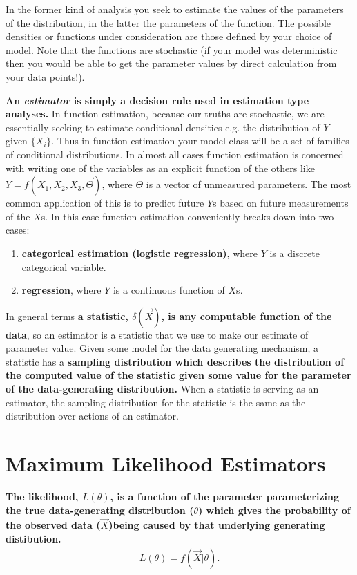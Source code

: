 In the former kind of analysis you seek to estimate the values of the parameters of the distribution, in the latter the parameters of the function. The possible densities or functions under consideration are those defined by your choice of model. Note that the functions are stochastic (if your model was deterministic then you would be able to get the parameter values by direct calculation from your data points!). 
\newline

\textbf{ An \emph{estimator} is simply a decision rule used in estimation type analyses.} In function estimation, because our truths are stochastic, we are essentially seeking to estimate conditional densities e.g. the distribution of $Y$ given $\{X_i\}$. Thus in function estimation your model class will be a set of families of conditional distributions. In almost all cases function estimation is concerned with writing one of the variables as an explicit function of the others like $Y = f(X_1, X_2, X_3, \vec{\Theta})$, where $\Theta$ is a vector of unmeasured parameters. The most common application of this is to predict future $Y$s based on future measurements of the $X$s. In this case function estimation conveniently breaks down into two cases: 
\begin{enumerate}
\item \textbf{categorical estimation (logistic regression)}, where $Y$ is a discrete categorical variable.
\item \textbf{regression}, where $Y$ is a continuous function of $X$s.
\end{enumerate}

In general terms \textbf{a statistic, $\delta(\vec{X})$, is any computable function of the data}, so an estimator is a statistic that we use to make our estimate of parameter value. Given some model for the data generating mechanism, a statistic has a \textbf{sampling distribution which describes the distribution of the computed value of the statistic given some value for the parameter of the data-generating distribution.} When a statistic is serving as an estimator, the sampling distribution for the statistic is the same as the distribution over actions of an estimator. 
\n


\section{Maximum Likelihood Estimators}
\textbf{The likelihood, $L(\theta)$, is a function of the parameter parameterizing the true data-generating distribution ($\theta$) which gives the probability of the observed data ($\vec{X}$)being caused by that underlying generating distibution.}
\begin{align*}
L(\theta) = f(\vec{X}|\theta).
\end{align*}

